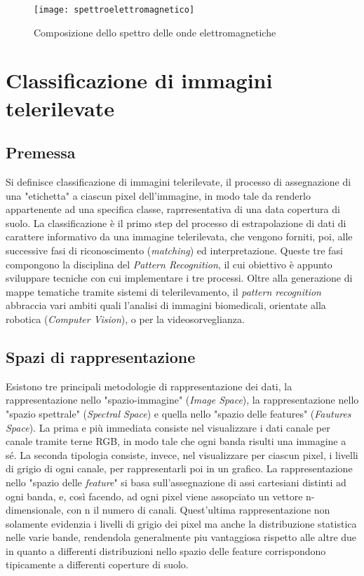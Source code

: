  \begin{figure}[!ht]
   \center
      \texttt{[image: spettroelettromagnetico]}
    \caption{Composizione dello spettro delle onde elettromagnetiche}
    \label{fig:spettroelettromagnetico}
  \end{figure}
\clearpage




\section{Classificazione di immagini telerilevate}

\subsection{Premessa}

Si definisce classificazione di immagini telerilevate, il processo di assegnazione di una "etichetta" a ciascun pixel dell'immagine, in modo tale da renderlo appartenente ad una specifica classe, raprresentativa di una data copertura di suolo.
La classificazione è il primo step del processo di estrapolazione di dati di carattere informativo da una immagine telerilevata, che vengono forniti, poi, alle successive fasi di riconoscimento (\emph{matching}) ed interpretazione. 
Queste tre fasi compongono la disciplina del \emph{Pattern Recognition}, il cui obiettivo è appunto sviluppare tecniche con cui implementare i tre processi.
Oltre alla generazione di mappe tematiche tramite sistemi di telerilevamento, il \emph{pattern recognition} abbraccia vari ambiti quali l'analisi di immagini biomedicali, orientate alla robotica (\emph{Computer Vision}), o per la videosorveglianza.   


\subsection{Spazi di rappresentazione}

Esistono tre principali metodologie di rappresentazione dei dati, la rappresentazione nello "spazio-immagine" (\emph{Image Space}), la rappresentazione nello "spazio spettrale" (\emph{Spectral Space}) e quella nello "spazio delle features" (\emph{Fautures Space}). La prima e più immediata consiste nel visualizzare i dati canale per canale tramite terne RGB, in modo tale che ogni banda risulti una immagine a sé. La seconda tipologia consiste, invece, nel visualizzare per ciascun pixel, i livelli di grigio di ogni canale, per rappresentarli poi in un grafico. La rappresentazione nello "spazio delle \emph{feature}" si basa sull'assegnazione di assi cartesiani distinti ad ogni banda, e, così facendo, ad ogni pixel viene assopciato un vettore n-dimensionale, con n il numero di canali. Quest'ultima rappresentazione non solamente evidenzia i livelli di grigio dei pixel ma anche la distribuzione statistica nelle varie bande, rendendola generalmente piu vantaggiosa rispetto alle altre due in quanto a differenti distribuzioni nello spazio delle feature corrispondono tipicamente a differenti coperture di suolo.  

